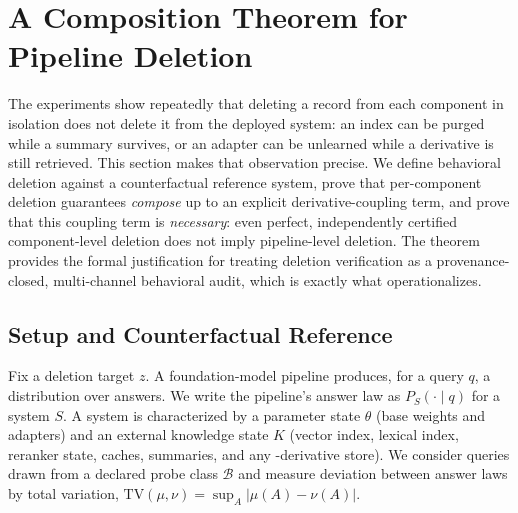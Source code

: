 %
%

\section{A Composition Theorem for Pipeline Deletion}
\label{sec:composition}

The experiments show repeatedly that deleting a record from each
component in isolation does not delete it from the deployed system: an
index can be purged while a summary survives, or an adapter can be
unlearned while a derivative is still retrieved. This section
makes that observation precise. We define behavioral deletion against a
counterfactual reference system, prove that per-component deletion
guarantees \emph{compose} up to an explicit derivative-coupling term,
and prove that this coupling term is \emph{necessary}: even perfect,
independently certified component-level deletion does not imply
pipeline-level deletion. The theorem provides the formal justification
for treating deletion verification as a provenance-closed, multi-channel
behavioral audit, which is exactly what \method{} operationalizes.

\subsection{Setup and Counterfactual Reference}

Fix a deletion target $z$. A foundation-model pipeline produces, for a
query $q$, a distribution over answers. We write the pipeline's answer
law as $P_{S}(\cdot\mid q)$ for a system $S$. A system is characterized
by a parameter state $\theta$ (base weights and adapters) and an
external knowledge state $K$ (vector index, lexical index, reranker
state, caches, summaries, and any -derivative store). We
consider queries drawn from a declared probe class $\mathcal{B}$ and
measure deviation between answer laws by total variation,
$\mathrm{TV}(\mu,\nu)=\sup_{A}\lvert\mu(A)-\nu(A)\rvert$.

